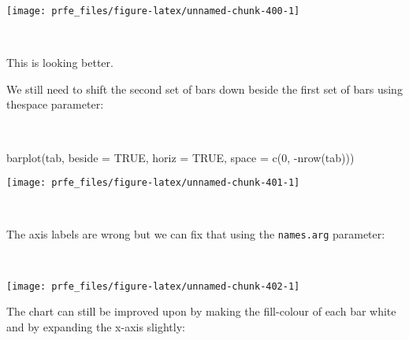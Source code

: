 \documentclass[
  12pt,
  a4paper]{book}
\newenvironment{Shaded}{\begin{snugshade}}{\end{snugshade}}
\newcommand{\AttributeTok}[1]{\textcolor[rgb]{0.77,0.63,0.00}{#1}}
\newcommand{\ConstantTok}[1]{\textcolor[rgb]{0.00,0.00,0.00}{#1}}
\newcommand{\DecValTok}[1]{\textcolor[rgb]{0.00,0.00,0.81}{#1}}
\newcommand{\FunctionTok}[1]{\textcolor[rgb]{0.00,0.00,0.00}{#1}}
\newcommand{\NormalTok}[1]{#1}
\newcommand{\OtherTok}[1]{\textcolor[rgb]{0.56,0.35,0.01}{#1}}
\newcommand{\SpecialCharTok}[1]{\textcolor[rgb]{0.00,0.00,0.00}{#1}}
\begin{document}
\begin{center}\texttt{[image: prfe\_files/figure-latex/unnamed-chunk-400-1]} \end{center}

~

This is looking better.

We still need to shift the second set of bars down beside the first set of bars using thespace parameter:

~

\begin{Shaded}
\begin{Highlighting}[]
\FunctionTok{barplot}\NormalTok{(tab, }\AttributeTok{beside =} \ConstantTok{TRUE}\NormalTok{, }\AttributeTok{horiz =} \ConstantTok{TRUE}\NormalTok{, }\AttributeTok{space =} \FunctionTok{c}\NormalTok{(}\DecValTok{0}\NormalTok{, }\SpecialCharTok{{-}}\FunctionTok{nrow}\NormalTok{(tab)))}
\end{Highlighting}
\end{Shaded}

\begin{center}\texttt{[image: prfe\_files/figure-latex/unnamed-chunk-401-1]} \end{center}

~

The axis labels are wrong but we can fix that using the \texttt{names.arg} parameter:

~

\begin{Shaded}
\end{Shaded}

\begin{center}\texttt{[image: prfe\_files/figure-latex/unnamed-chunk-402-1]} \end{center}

\newpage

The chart can still be improved upon by making the fill-colour of each bar white and by expanding the x-axis slightly:
\end{document}
